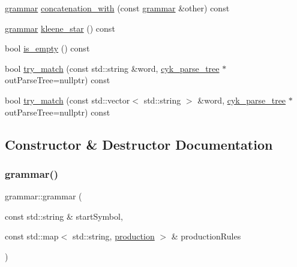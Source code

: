 \begin{DoxyCompactItemize}
\item 
\mbox{\hyperlink{classgrammar}{grammar}} \mbox{\hyperlink{classgrammar_ade6431312e7273027055a13c704e9e41}{concatenation\+\_\+with}} (const \mbox{\hyperlink{classgrammar}{grammar}} \&other) const
\item 
\mbox{\hyperlink{classgrammar}{grammar}} \mbox{\hyperlink{classgrammar_a83ff8da91405eade6d7e991371d57230}{kleene\+\_\+star}} () const
\item 
bool \mbox{\hyperlink{classgrammar_a1d5ab32a94db0da5dfde871e5d9ce19a}{is\+\_\+empty}} () const
\item 
bool \mbox{\hyperlink{classgrammar_a499f2e8760673b17bee51cc6f66b2b3c}{try\+\_\+match}} (const std\+::string \&word, \mbox{\hyperlink{classcyk__parse__tree}{cyk\+\_\+parse\+\_\+tree}} $\ast$out\+Parse\+Tree=nullptr) const
\item 
bool \mbox{\hyperlink{classgrammar_af46a1bef1d9f68dc8cd00eb094c07430}{try\+\_\+match}} (const std\+::vector$<$ std\+::string $>$ \&word, \mbox{\hyperlink{classcyk__parse__tree}{cyk\+\_\+parse\+\_\+tree}} $\ast$out\+Parse\+Tree=nullptr) const
\end{DoxyCompactItemize}


\subsection{Constructor \& Destructor Documentation}
\mbox{\label{classgrammar_ac5f3203b55ddacb4be6812e28bc24c54}} 
\subsubsection{\texorpdfstring{grammar()}{grammar()}\hspace{0.1cm}{\footnotesize\ttfamily [1/3]}}
{\footnotesize\ttfamily grammar\+::grammar (\begin{DoxyParamCaption}\item[{const std\+::string \&}]{start\+Symbol,  }\item[{const std\+::map$<$ std\+::string, \mbox{\hyperlink{classproduction}{production}} $>$ \&}]{production\+Rules }\end{DoxyParamCaption})\hspace{0.3cm}{\ttfamily [inline]}}

\mbox{\label{classgrammar_a938b62e11d5b77d1d1345a09bdf0c53a}} 
